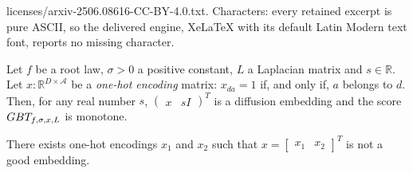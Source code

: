 \documentclass[10pt,a4paper]{amsart}
\newcommand{\GBT}{\textsc{GBT}}
\newcommand{\cA}{\mathcal A}
\begin{document}
licenses/arxiv-2506.08616-CC-BY-4.0.txt. Characters: every retained excerpt is pure ASCII, so the delivered engine, XeLaTeX with its default Latin Modern text font, reports no missing character.
\begin{theorem}
\label{theo:onehotencoding}
    Let $f$ be a root law,
    $\sigma > 0$ a positive constant,
    $L$ a Laplacian matrix and $s \in \mathbb{R}$.
    Let $x : \mathbb{R}^{D \times \cA}$
    be a \emph{one-hot encoding} matrix: $x_{da} = 1$ if, and only if, $a$ belongs to $d$.
    Then, for any real number $s$, 
    $\begin{pmatrix} x & sI \end{pmatrix}^T$ is a diffusion embedding
    and the score $\GBT_{f,\sigma,x,L}$ is monotone.
\end{theorem}

\begin{proposition}
\label{prop:counterexampleb}
    There exists one-hot encodings $x_1$ and $x_2$ such that $x=\begin{bmatrix}
        x_1 &
        x_2
    \end{bmatrix}^T$ is not a good embedding.
\end{proposition}
\end{document}
